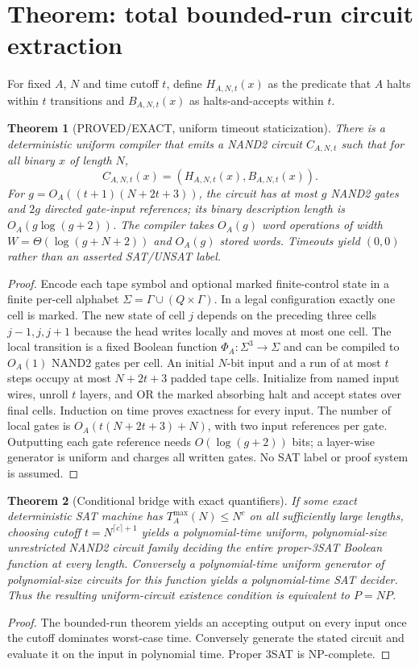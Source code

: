 \documentclass[10pt]{article}
\newtheorem{theorem}{Theorem}
\begin{document}
\section{Theorem: total bounded-run circuit extraction}
For fixed $A$, $N$ and time cutoff $t$, define $H_{A,N,t}(x)$ as the predicate that $A$ halts within $t$ transitions and $B_{A,N,t}(x)$ as halts-and-accepts within $t$.

\begin{theorem}[PROVED/EXACT, uniform timeout staticization]
There is a deterministic uniform compiler that emits a NAND2 circuit $C_{A,N,t}$ such that for all binary $x$ of length $N$,
\[
C_{A,N,t}(x)=(H_{A,N,t}(x),B_{A,N,t}(x)).
\]
For $g=O_A((t+1)(N+2t+3))$, the circuit has at most $g$ NAND2 gates and $2g$ directed gate-input references; its binary description length is $O_A(g\log(g+2))$. The compiler takes $O_A(g)$ word operations of width $W=\Theta(\log(g+N+2))$ and $O_A(g)$ stored words. Timeouts yield $(0,0)$ rather than an asserted SAT/UNSAT label.
\end{theorem}
\begin{proof}
Encode each tape symbol and optional marked finite-control state in a finite per-cell alphabet $\Sigma=\Gamma\cup(Q\times\Gamma)$. In a legal configuration exactly one cell is marked. The new state of cell $j$ depends on the preceding three cells $j-1,j,j+1$ because the head writes locally and moves at most one cell. The local transition is a fixed Boolean function $\Phi_A:\Sigma^3\to\Sigma$ and can be compiled to $O_A(1)$ NAND2 gates per cell. An initial $N$-bit input and a run of at most $t$ steps occupy at most $N+2t+3$ padded tape cells. Initialize from named input wires, unroll $t$ layers, and OR the marked absorbing halt and accept states over final cells. Induction on time proves exactness for every input. The number of local gates is $O_A(t(N+2t+3)+N)$, with two input references per gate. Outputting each gate reference needs $O(\log(g+2))$ bits; a layer-wise generator is uniform and charges all written gates. No SAT label or proof system is assumed.
\end{proof}

\begin{theorem}[Conditional bridge with exact quantifiers]
If some exact deterministic SAT machine has $T_A^{\max}(N)\le N^c$ on all sufficiently large lengths, choosing cutoff $t=N^{\lceil c\rceil+1}$ yields a polynomial-time uniform, polynomial-size unrestricted NAND2 circuit family deciding the \emph{entire} proper-3SAT Boolean function at every length. Conversely a polynomial-time uniform generator of polynomial-size circuits for this function yields a polynomial-time SAT decider. Thus the resulting uniform-circuit existence condition is equivalent to $P=NP$.
\end{theorem}
\begin{proof}The bounded-run theorem yields an accepting output on every input once the cutoff dominates worst-case time. Conversely generate the stated circuit and evaluate it on the input in polynomial time. Proper 3SAT is NP-complete. \end{proof}
\end{document}
